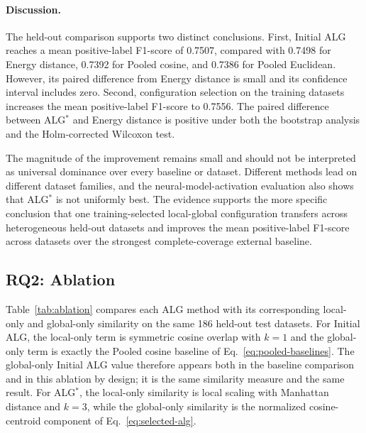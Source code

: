 \documentclass[preprint,12pt]{elsarticle}
\begin{document}
\FloatBarrier


\paragraph{Discussion.}
The held-out comparison supports two distinct conclusions. First, Initial ALG
reaches a mean positive-label F1-score of 0.7507, compared with 0.7498 for
Energy distance,
0.7392 for Pooled cosine, and 0.7386 for Pooled Euclidean. However, its paired
difference from Energy distance is small and its confidence interval includes
zero. Second, configuration selection on the training datasets increases the
mean positive-label F1-score to 0.7556. The paired difference between ALG$^*$
and Energy
distance is positive under both the bootstrap analysis and the Holm-corrected
Wilcoxon test.

The magnitude of the improvement remains small and should not be interpreted
as universal dominance over every baseline or dataset. Different methods lead
on different dataset families, and the neural-model-activation evaluation also
shows that ALG$^*$ is not uniformly best. The evidence supports the more
specific conclusion that one training-selected local-global configuration
transfers across heterogeneous held-out datasets and improves the
mean positive-label F1-score across datasets over the strongest
complete-coverage external
baseline.

\FloatBarrier

\subsection{RQ2: Ablation}

Table~\ref{tab:ablation} compares each ALG method with its corresponding
local-only and global-only similarity on the same 186 held-out test datasets.
For Initial ALG, the local-only term is symmetric cosine overlap with $k=1$ and
the global-only term is exactly the Pooled cosine baseline of
Eq.~\eqref{eq:pooled-baselines}. The global-only Initial ALG value therefore
appears both in the baseline comparison and in this ablation by design; it is
the same similarity measure and the same result. For ALG$^*$, the local-only
similarity is local scaling with Manhattan distance and $k=3$, while the
global-only similarity is the normalized cosine-centroid component of
Eq.~\eqref{eq:selected-alg}.
\end{document}
